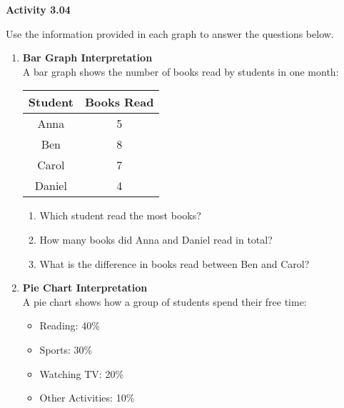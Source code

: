 \vspace{0.3ex}
\noindent\textbf{Activity 3.04}

\vspace{0.2ex}

Use the information provided in each graph to answer the questions below.

\begin{enumerate}[label=\color{blue}\arabic*.]
    \item \textbf{Bar Graph Interpretation} \\
    A bar graph shows the number of books read by students in one month:

    \begin{center}
    \begin{tabular}{|c|c|}
        \hline
        \textbf{Student} & \textbf{Books Read} \\
        \hline
        Anna & 5 \\
        Ben & 8 \\
        Carol & 7 \\
        Daniel & 4 \\
        \hline
    \end{tabular}
    \end{center}

    \begin{enumerate}[label=(\alph*)]
        \item Which student read the most books?
        \item How many books did Anna and Daniel read in total?
        \item What is the difference in books read between Ben and Carol?
    \end{enumerate}

    \item \textbf{Pie Chart Interpretation} \\
    A pie chart shows how a group of students spend their free time:
    
    \begin{itemize}
        \item Reading: 40\%
        \item Sports: 30\%
        \item Watching TV: 20\%
        \item Other Activities: 10\%
    \end{itemize}
    

\end{enumerate}
